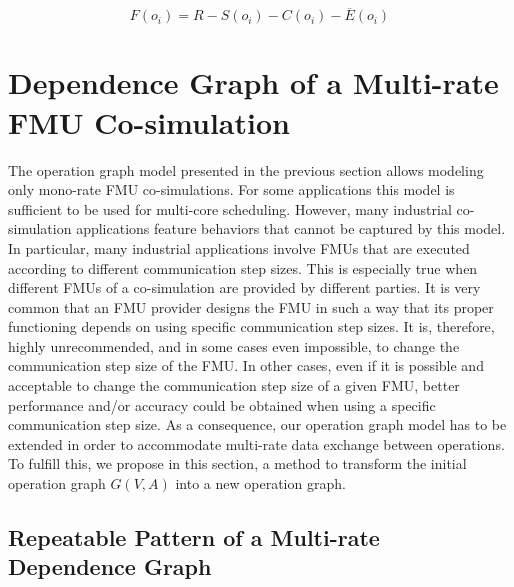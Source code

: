 \begin{equation}
	F(o_i) = R - S(o_i) - C(o_i) - \overline{E}(o_i) 
	\label{eq:flex}
\end{equation}

\section{\label{sec:opgraph}Dependence Graph of a Multi-rate FMU Co-simulation}

The operation graph model presented in the previous section allows modeling only mono-rate FMU co-simulations. For some applications this model is sufficient to be used for multi-core scheduling. However, many industrial co-simulation applications feature behaviors that cannot be captured by this model. In particular, many industrial applications involve FMUs that are executed according to different communication step sizes. This is especially true when different FMUs of a co-simulation are provided by different parties. It is very common that an FMU provider designs the FMU in such a way that its proper functioning depends on using specific communication step sizes. It is, therefore, highly unrecommended, and in some cases even impossible, to change the communication step size of the FMU. In other cases, even if it is possible and acceptable to change the communication step size of a given FMU, better performance and/or accuracy could be obtained when using a specific communication step size. As a consequence, our operation graph model has to be extended in order to accommodate multi-rate data exchange between operations. To fulfill this, we propose in this section, a method to transform the initial operation graph $G(V,A)$ into a new operation graph. 

\subsection{Repeatable Pattern of a Multi-rate Dependence Graph}

